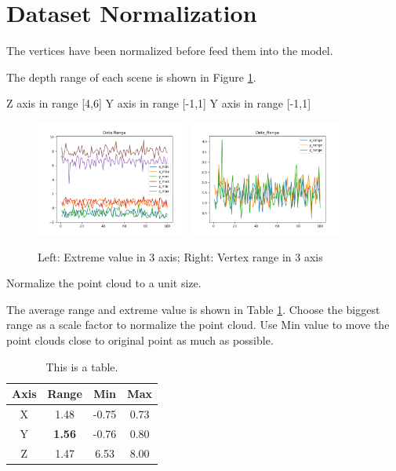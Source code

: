 \section{Dataset Normalization}

The vertices have been normalized before feed them into the model. 

The depth range of each scene is shown in Figure \ref{fig:data_range}.

Z axis in range [4,6]
Y axis in range [-1,1]
Y axis in range [-1,1]

\begin{figure}
	\centering
	{\includegraphics[width=0.45\textwidth]{./pic/Data_Extreme.png}}
	{\includegraphics[width=0.45\textwidth]{./pic/Data_Range.png}}
	\label{fig:data_range}
	\caption{Left: Extreme value in 3 axis; Right: Vertex range in 3 axis}
\end{figure}

Normalize the point cloud to a unit size.

The average range and extreme value is shown in Table \ref{tab:data_range}. Choose the biggest range as a scale factor to normalize the point cloud. Use Min value to move the point clouds close to original point as much as possible.

\begin{table}[t]
	\centering
	\begin{tabular}{|c|c|c|c|}
		\hline
		Axis & Range & Min & Max\\
		\hline
		X & 1.48 & -0.75 & 0.73\\
		Y & \textbf{1.56} & -0.76 & 0.80\\
		Z & 1.47 & 6.53 & 8.00\\
		\hline
	\end{tabular}
	\caption{This is a table.}
	\label{tab:data_range}
\end{table}